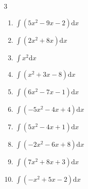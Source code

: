 \begin{multicols}{3}
\begin{enumerate}

\columnbreak %

  \item $\displaystyle \int \left( 5x^{2}-9x-2 \right) \mathrm{d}x$


  \item $\displaystyle \int \left( 2x^{2}+8x \right) \mathrm{d}x$


  \item $\displaystyle \int x^{2} \mathrm{d}x$


  \item $\displaystyle \int \left( x^{2}+3x-8 \right) \mathrm{d}x$


  \item $\displaystyle \int \left( 6x^{2}-7x-1 \right) \mathrm{d}x$


  \item $\displaystyle \int \left( -5x^{2}-4x+4 \right) \mathrm{d}x$


  \item $\displaystyle \int \left( 5x^{2}-4x+1 \right) \mathrm{d}x$


  \item $\displaystyle \int \left( -2x^{2}-6x+8 \right) \mathrm{d}x$


  \item $\displaystyle \int \left( 7x^{2}+8x+3 \right) \mathrm{d}x$


  \item $\displaystyle \int \left( -x^{2}+5x-2 \right) \mathrm{d}x$


\end{enumerate}
\end{multicols}
